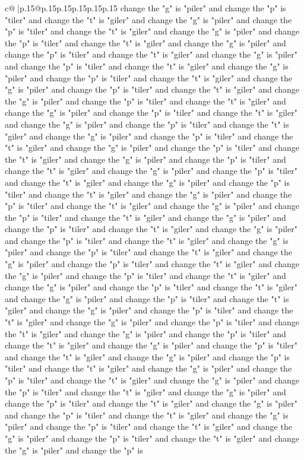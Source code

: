 \documentclass{article}
\begin{document}
{\begin{supertabular}{c@{$\;$}|p{.15\linewidth}@{}p{.15\linewidth}p{.15\linewidth}p{.15\linewidth}p{.15\linewidth}p{.15\linewidth}}
{{{change the "g" is "piler" and change the "p" is "tiler" and change the "t" is "giler" and change the "g" is "piler" and change the "p" is "tiler" and change the "t" is "giler" and change the "g" is "piler" and change the "p" is "tiler" and change the "t" is "giler" and change the "g" is "piler" and change the "p" is "tiler" and change the "t" is "giler" and change the "g" is "piler" and change the "p" is "tiler" and change the "t" is "giler" and change the "g" is "piler" and change the "p" is "tiler" and change the "t" is "giler" and change the "g" is "piler" and change the "p" is "tiler" and change the "t" is "giler" and change the "g" is "piler" and change the "p" is "tiler" and change the "t" is "giler" and change the "g" is "piler" and change the "p" is "tiler" and change the "t" is "giler" and change the "g" is "piler" and change the "p" is "tiler" and change the "t" is "giler" and change the "g" is "piler" and change the "p" is "tiler" and change the "t" is "giler" and change the "g" is "piler" and change the "p" is "tiler" and change the "t" is "giler" and change the "g" is "piler" and change the "p" is "tiler" and change the "t" is "giler" and change the "g" is "piler" and change the "p" is "tiler" and change the "t" is "giler" and change the "g" is "piler" and change the "p" is "tiler" and change the "t" is "giler" and change the "g" is "piler" and change the "p" is "tiler" and change the "t" is "giler" and change the "g" is "piler" and change the "p" is "tiler" and change the "t" is "giler" and change the "g" is "piler" and change the "p" is "tiler" and change the "t" is "giler" and change the "g" is "piler" and change the "p" is "tiler" and change the "t" is "giler" and change the "g" is "piler" and change the "p" is "tiler" and change the "t" is "giler" and change the "g" is "piler" and change the "p" is "tiler" and change the "t" is "giler" and change the "g" is "piler" and change the "p" is "tiler" and change the "t" is "giler" and change the "g" is "piler" and change the "p" is "tiler" and change the "t" is "giler" and change the "g" is "piler" and change the "p" is "tiler" and change the "t" is "giler" and change the "g" is "piler" and change the "p" is "tiler" and change the "t" is "giler" and change the "g" is "piler" and change the "p" is "tiler" and change the "t" is "giler" and change the "g" is "piler" and change the "p" is "tiler" and change the "t" is "giler" and change the "g" is "piler" and change the "p" is "tiler" and change the "t" is "giler" and change the "g" is "piler" and change the "p" is "tiler" and change the "t" is "giler" and change the "g" is "piler" and change the "p" is "tiler" and change the "t" is "giler" and change the "g" is "piler" and change the "p" is "tiler" and change the "t" is "giler" and change the "g" is "piler" and change the "p" is "tiler" and change the "t" is "giler" and change the "g" is "piler" and change the "p" is "tiler" and change the "t" is "giler" and change the "g" is "piler" and change the "p" is "tiler" and change the "t" is "giler" and change the "g" is "piler" and change the "p" is "tiler" and change the "t" is "giler" and change the "g" is "piler" and change the "p" is }}}
\end{supertabular}}
\end{document}
